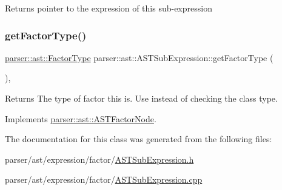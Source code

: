 \begin{DoxyReturn}{Returns}
pointer to the expression of this sub-\/expression 
\end{DoxyReturn}
\mbox{\label{classparser_1_1ast_1_1ASTSubExpression_a0a7ade91b1cce64eacfb9b5f6167db3f}} 
\subsubsection{\texorpdfstring{get\+Factor\+Type()}{getFactorType()}}
{\footnotesize\ttfamily \hyperlink{ASTFactorNode_8h_afbe2fcc03ef15b74a0c1ed1cda7ab0e8}{parser\+::ast\+::\+Factor\+Type} parser\+::ast\+::\+A\+S\+T\+Sub\+Expression\+::get\+Factor\+Type (\begin{DoxyParamCaption}{ }\end{DoxyParamCaption})\hspace{0.3cm}{\ttfamily [override]}, {\ttfamily [virtual]}}

\begin{DoxyReturn}{Returns}
The type of factor this is. Use instead of checking the class type. 
\end{DoxyReturn}


Implements \hyperlink{classparser_1_1ast_1_1ASTFactorNode_a13eea7f949c0055dea0a9d7b715f16a8}{parser\+::ast\+::\+A\+S\+T\+Factor\+Node}.



The documentation for this class was generated from the following files\+:\begin{DoxyCompactItemize}
\item 
parser/ast/expression/factor/\hyperlink{ASTSubExpression_8h}{A\+S\+T\+Sub\+Expression.\+h}\item 
parser/ast/expression/factor/\hyperlink{ASTSubExpression_8cpp}{A\+S\+T\+Sub\+Expression.\+cpp}\end{DoxyCompactItemize}
